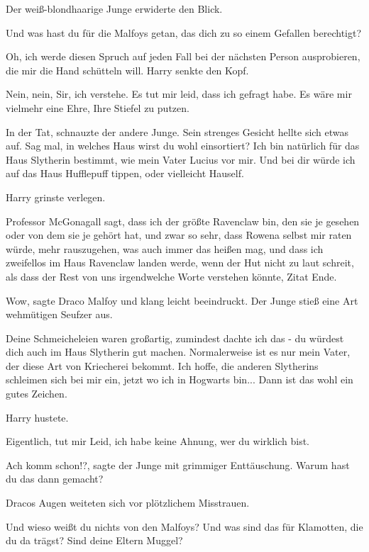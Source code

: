 Der weiß-blondhaarige Junge erwiderte den Blick.

\glqq{}Und was hast du für die Malfoys getan, das dich zu so einem Gefallen
berechtigt?\grqq{}

Oh, ich werde diesen Spruch auf jeden Fall bei der nächsten Person ausprobieren,
die mir die Hand schütteln will. Harry senkte den Kopf.

\glqq{}Nein, nein, Sir, ich verstehe. Es tut mir leid, dass ich gefragt habe. Es
wäre mir vielmehr eine Ehre, Ihre Stiefel zu putzen.\grqq{}

\glqq{}In der Tat\grqq{}, schnauzte der andere Junge. Sein strenges Gesicht
hellte sich etwas auf. \glqq{}Sag mal, in welches Haus wirst du wohl einsortiert?
Ich bin natürlich für das Haus Slytherin bestimmt, wie mein Vater Lucius vor
mir. Und bei dir würde ich auf das Haus Hufflepuff tippen, oder vielleicht
Hauself.

Harry grinste verlegen.

\glqq{}Professor McGonagall sagt, dass ich der größte Ravenclaw bin, den sie je
gesehen oder von dem sie je gehört hat, und zwar so sehr, dass Rowena selbst mir
raten würde, mehr rauszugehen, was auch immer das heißen mag, und dass ich
zweifellos im Haus Ravenclaw landen werde, wenn der Hut nicht zu laut schreit,
als dass der Rest von uns irgendwelche Worte verstehen könnte, Zitat
Ende.\grqq{}

\glqq{}Wow\grqq{}, sagte Draco Malfoy und klang leicht beeindruckt. Der Junge
stieß eine Art wehmütigen Seufzer aus.

\glqq{}Deine Schmeicheleien waren großartig, zumindest dachte ich das - du
würdest dich auch im Haus Slytherin gut machen. Normalerweise ist es nur mein
Vater, der diese Art von Kriecherei bekommt. Ich hoffe, die anderen Slytherins
schleimen sich bei mir ein, jetzt wo ich in Hogwarts bin... Dann ist das wohl
ein gutes Zeichen.\grqq{}

Harry hustete.

\glqq{}Eigentlich, tut mir Leid, ich habe keine Ahnung, wer du wirklich
bist.\grqq{}

\glqq{}Ach komm schon!?\grqq{}, sagte der Junge mit grimmiger Enttäuschung. \glqq{}
Warum hast du das dann gemacht?\grqq{}

Dracos Augen weiteten sich vor plötzlichem Misstrauen.

\glqq{}Und wieso weißt du nichts von den Malfoys? Und was sind das für Klamotten,
die du da trägst? Sind deine Eltern Muggel?\grqq{}


